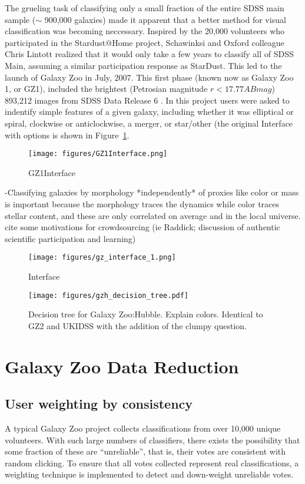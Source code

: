 The grueling task of classifying only a small fraction of the entire SDSS main sample ($\sim$ 900,000 galaxies) made it apparent that a better method for visual classification was becoming neccessary. Inspired by the 20,000 volunteers who participated in the Stardust@Home project, Schawinksi and Oxford colleague Chris Lintott realized that it would only take a few years to classify all of SDSS Main, assuming a similar participation response as StarDust. This led to the launch of Galaxy Zoo in July, 2007. This first phase (known now as Galaxy Zoo 1, or GZ1), included the brightest (Petrosian magnitude $r < 17.77 AB mag$) 893,212 images from SDSS Data Release 6 \citep{Strauss2002,Adelman-McCarthy2008}. In this project users were asked to indentify simple features of a given galaxy, including whether it was elliptical or spiral, clockwise or anticlockwise, a merger, or star/other (the original Interface with options is shown in Figure~\ref{GZ1_Interface}. 

\begin{figure}
\centering
\texttt{[image: figures/GZ1Interface.png]}
\caption{GZ1Interface}
\label{GZ1_Interface}
\end{figure}

-Classifying galaxies by morphology *independently* of proxies like color or mass is important because the morphology traces the dynamics while color traces stellar content, and these are only correlated on average and in the local universe. 
cite some motivations for crowdsourcing (ie Raddick; discussion of authentic scientific participation and learning)




\begin{figure}
\centering
\texttt{[image: figures/gz\_interface\_1.png]}
\caption{Interface}
\end{figure}

\begin{figure}
\centering
\texttt{[image: figures/gzh\_decision\_tree.pdf]}
\caption{Decision tree for Galaxy Zoo:Hubble. Explain colors. Identical to GZ2 and UKIDSS with the addition of the clumpy question.}
\end{figure}

\section{Galaxy Zoo Data Reduction}
\subsection{User weighting by consistency}
A typical Galaxy Zoo project collects classifications from over 10,000 unique volunteers. With such large numbers of classifiers, there exists the possibility that some fraction of these are ``unreliable'', that is, their votes are consistent with random clicking. To ensure that all votes collected represent real classifications, a weighting technique is implemented to detect and down-weight unreliable votes.

